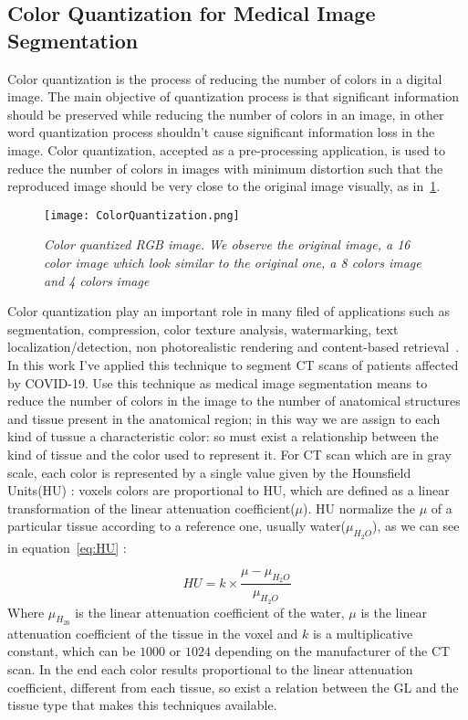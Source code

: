\documentclass{standalone}
\begin{document}
	\subsection{Color Quantization for Medical Image Segmentation}
	

	Color quantization is the process of reducing the number of colors in a digital image. The main objective of quantization process is that 
	significant information should be preserved while reducing the number of colors in an image, in other word quantization process shouldn’t cause 
	significant information loss in the image. 
	Color quantization, accepted as a pre-processing application, is used to reduce the number of colors in images with minimum distortion such that the 
	reproduced image should be very close to the original image visually, as in \figurename\,\ref{fig:ColorQuantization}. 

	\begin{figure}[h!]
		
		\centering
			\texttt{[image: ColorQuantization.png]}
		\caption{\textit{Color quantized RGB image. We observe the original image, a 16 color image which look similar to the original one, a 8 colors image and 4 colors image}}\label{fig:ColorQuantization}
	\end{figure}

	Color quantization play an important role in many filed of applications such as segmentation, compression, color texture analysis, watermarking, 
	text localization/detection, non photorealistic rendering and content-based retrieval~\cite{ART:Ozturk}.\\
	
	
	In this work I've applied this technique to segment CT scans of patients affected by COVID-19. Use this technique as medical image segmentation means to reduce the number of colors in the image to the number of anatomical structures and tissue present in the anatomical region; in this way we are assign to each kind of tussue a characteristic color: so must exist a relationship between the kind of tissue and the color used to represent it. 
	For CT scan which are in gray scale, each color is represented by a single value given by the Hounsfield Units(HU) : voxels colors are proportional to HU, which are defined as a linear transformation of the linear attenuation coefficient($\mu$). HU normalize the $\mu$ of a particular tissue according to a reference one, usually water($\mu_{H_2 O}$), as we can see in equation \,\ref{eq:HU} : 
	
	\begin{equation}\label{eq:HU}
		HU = k\times\frac{\mu - \mu_{H_2 O}}{\mu_{H_2 O}}
	\end{equation}
	Where $\mu_{H_20}$ is the linear attenuation coefficient of the water, $\mu$ is the linear attenuation coefficient of the tissue in the voxel and $k$ is a multiplicative constant, which can be $1000$ or $1024$ depending on the manufacturer of the CT scan.	
	In the end each color results proportional to the linear attenuation coefficient, different from each tissue, so exist a relation between the GL and the tissue type that makes this techniques available. \\
	
\end{document}
